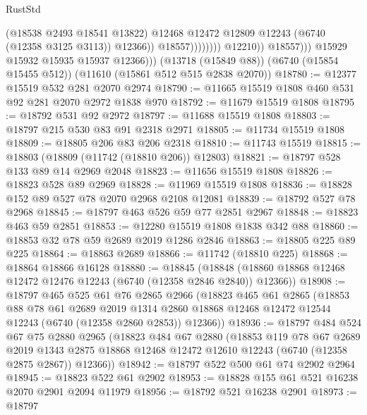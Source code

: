 \begin{lexlean}{RustStd}
\begin{coremodule}
                                        (@18538 @2493 @18541 @13822)
                                        @12468
                                        @12472
                                        @12809
                                        @12243
                                        (@6740 (@12358 @3125 @3113))
                                        @12366))
                                    @18557))))))))
                    @12210))
                @18557)))
          @15929
          @15932
          @15935
          @15937
          @12366)))
    (@13718 (@15849 @88))
    (@6740 (@15854 @15455 @512))
    (@11610 (@15861 @512 @515 @2838 @2070))
@18780 := @12377 @15519 @532 @281 @2070 @2974
@18790 := @11665 @15519 @1808 @460 @531 @92 @281 @2070 @2972 @1838 @970
@18792 := @11679 @15519 @1808
@18795 := @18792 @531 @92 @2972
@18797 := @11688 @15519 @1808
@18803 := @18797 @215 @530 @83 @91 @2318 @2971
@18805 := @11734 @15519 @1808
@18809 := @18805 @206 @83 @206 @2318
@18810 := @11743 @15519
@18815 := @18803 (@18809 (@11742 (@18810 @206)) @12803)
@18821 := @18797 @528 @133 @89 @14 @2969 @2048
@18823 := @11656 @15519 @1808
@18826 := @18823 @528 @89 @2969
@18828 := @11969 @15519 @1808
@18836 := @18828 @152 @89 @527 @78 @2070 @2968 @2108 @12081
@18839 := @18792 @527 @78 @2968
@18845 := @18797 @463 @526 @59 @77 @2851 @2967
@18848 := @18823 @463 @59 @2851
@18853 := @12280 @15519 @1808 @1838 @342 @88
@18860 := @18853 @32 @78 @59 @2689 @2019 @1286 @2846
@18863 := @18805 @225 @89 @225
@18864 := @18863 @2689
@18866 := @11742 (@18810 @225)
@18868 := @18864 @18866 @16128
@18880 := @18845
    (@18848 (@18860 @18868 @12468 @12472 @12476 @12243 (@6740 (@12358 @2846 @2840)) @12366))
@18908 := @18797
    @465
    @525
    @61
    @76
    @2865
    @2966
    (@18823
      @465
      @61
      @2865
      (@18853
        @88
        @78
        @61
        @2689
        @2019
        @1314
        @2860
        @18868
        @12468
        @12472
        @12544
        @12243
        (@6740 (@12358 @2860 @2853))
        @12366))
@18936 := @18797
    @484
    @524
    @67
    @75
    @2880
    @2965
    (@18823
      @484
      @67
      @2880
      (@18853
        @119
        @78
        @67
        @2689
        @2019
        @1343
        @2875
        @18868
        @12468
        @12472
        @12610
        @12243
        (@6740 (@12358 @2875 @2867))
        @12366))
@18942 := @18797 @522 @500 @61 @74 @2902 @2964
@18945 := @18823 @522 @61 @2902
@18953 := @18828 @155 @61 @521 @16238 @2070 @2901 @2094 @11979
@18956 := @18792 @521 @16238 @2901
@18973 := @18797

\end{coremodule}
\end{lexlean}
